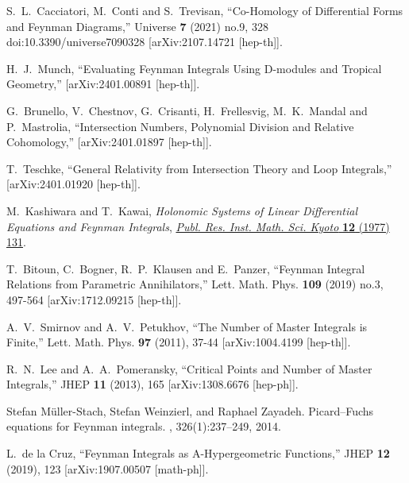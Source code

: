 \documentclass[a4paper,12pt]{article}
\numberwithin{equation}{section}
\numberwithin{figure}{section}
\begin{document}
\begin{thebibliography}{99}
S.~L.~Cacciatori, M.~Conti and S.~Trevisan,
``Co-Homology of Differential Forms and Feynman Diagrams,''
Universe \textbf{7} (2021) no.9, 328
doi:10.3390/universe7090328
[arXiv:2107.14721 [hep-th]].

H.~J.~Munch,
``Evaluating Feynman Integrals Using D-modules and Tropical Geometry,''
[arXiv:2401.00891 [hep-th]].
  
G.~Brunello, V.~Chestnov, G.~Crisanti, H.~Frellesvig, M.~K.~Mandal and P.~Mastrolia,
``Intersection Numbers, Polynomial Division and Relative Cohomology,''
[arXiv:2401.01897 [hep-th]].

T.~Teschke,
``General Relativity from Intersection Theory and Loop Integrals,''
[arXiv:2401.01920 [hep-th]].
  


M.~Kashiwara and T.~Kawai, \emph{{Holonomic Systems of Linear Differential
		Equations and Feynman Integrals}},
\href{https://doi.org/10.2977/prims/1195196602}{\emph{Publ. Res. Inst. Math.
		Sci. Kyoto} {\bfseries 12} (1977) 131}.

  
T.~Bitoun, C.~Bogner, R.~P.~Klausen and E.~Panzer,
``Feynman Integral Relations from Parametric Annihilators,''
Lett. Math. Phys. \textbf{109} (2019) no.3, 497-564
[arXiv:1712.09215 [hep-th]].

A.~V.~Smirnov and A.~V.~Petukhov,
``The Number of Master Integrals is Finite,''
Lett. Math. Phys. \textbf{97} (2011), 37-44
[arXiv:1004.4199 [hep-th]].



R.~N.~Lee and A.~A.~Pomeransky,
``Critical Points and Number of Master Integrals,''
JHEP \textbf{11} (2013), 165
[arXiv:1308.6676 [hep-ph]].



Stefan M{\"u}ller-Stach, Stefan Weinzierl, and Raphael Zayadeh.
\newblock Picard--{F}uchs equations for {F}eynman integrals.
,
326(1):237--249, 2014.
\newblock [arXiv:1212.4389]
  
L.~de la Cruz,
``Feynman Integrals as A-Hypergeometric Functions,''
JHEP \textbf{12} (2019), 123
[arXiv:1907.00507 [math-ph]].


\end{thebibliography}
\end{document}
